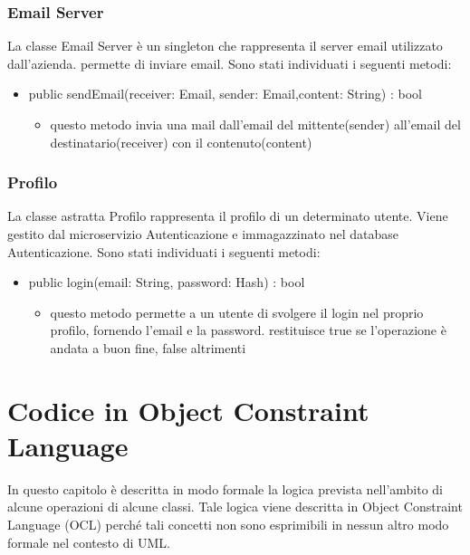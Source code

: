 \documentclass{report}
\begin{document}
\subsection*{Email Server}
La classe Email Server è un singleton che rappresenta il server email utilizzato dall'azienda. permette di inviare email.
Sono stati individuati i seguenti metodi:
\begin{itemize}
	\item public sendEmail(receiver: Email, sender: Email,content: String) : bool
	\begin{itemize}
		\item questo metodo invia una mail dall'email del mittente(sender) all'email del destinatario(receiver) con il contenuto(content)
	\end{itemize}
\end{itemize}
\subsection*{Profilo}
La classe astratta Profilo rappresenta il profilo di un determinato utente. Viene gestito dal microservizio Autenticazione e immagazzinato nel database Autenticazione.
Sono stati individuati i seguenti metodi:
\begin{itemize}
	\item public login(email: String, password: Hash) : bool
	\begin{itemize}
		\item questo metodo permette a un utente di svolgere il login nel proprio profilo, fornendo l'email e la password. restituisce true se l'operazione è andata a buon fine, false altrimenti
	\end{itemize}
\end{itemize}
\chapter{Codice in Object Constraint Language}	
In questo capitolo è descritta in modo formale la logica prevista nell’ambito di alcune operazioni di alcune classi.
Tale logica viene descritta in Object Constraint Language (OCL) perché tali concetti non sono esprimibili in nessun altro modo formale nel contesto di UML.	
\end{document}
